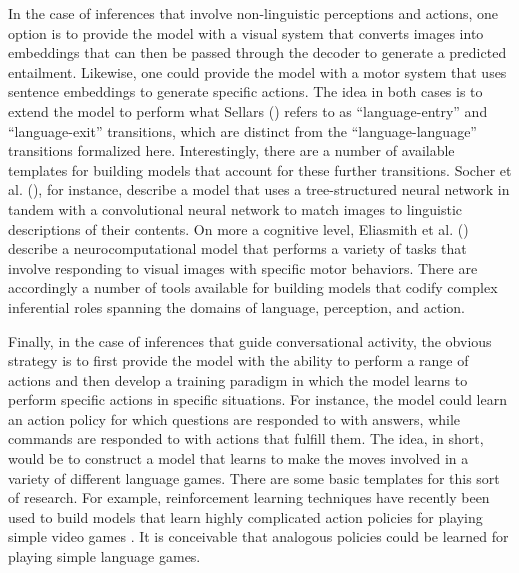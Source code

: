 In the case of inferences that involve non-linguistic perceptions and actions, one option is to provide the model with a visual system that converts images into embeddings that can then be passed through the decoder to generate a predicted entailment. Likewise, one could provide the model with a motor system that uses sentence embeddings to generate specific actions. The idea in both cases is to extend the model to perform what Sellars (\citeyear{Sellars:1953}) refers to as ``language-entry'' and ``language-exit'' transitions, which are distinct from the ``language-language'' transitions formalized here. Interestingly, there are a number of available templates for building models that account for these further transitions. Socher et al. (\citeyear{Socher:2014}), for instance, describe a model that uses a tree-structured neural network in tandem with a convolutional neural network to match images to linguistic descriptions of their contents. On more a cognitive level, Eliasmith et al. (\citeyear{Eliasmith:2012}) describe a neurocomputational model that performs a variety of tasks that involve responding to visual images with specific motor behaviors. There are accordingly a number of tools available for building models that codify complex inferential roles spanning the domains of language, perception, and action. 

Finally, in the case of inferences that guide conversational activity, the obvious strategy is to first provide the model with the ability to perform a range of actions and then develop a training paradigm in which the model learns to perform specific actions in specific situations. For instance, the model could learn an action policy for which questions are responded to with answers, while commands are responded to with actions that fulfill them. The idea, in short, would be to construct a model that learns to make the moves involved in a variety of different language games. There are some basic templates for this sort of research. For example, reinforcement learning techniques have recently been used to build models that learn highly complicated action policies for playing simple video games \citep{Mnih:2015}. It is conceivable that analogous policies could be learned for playing simple language games.

